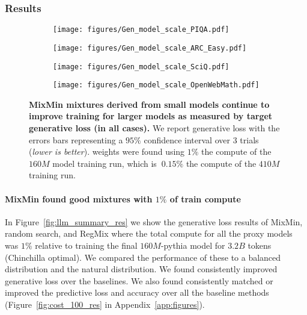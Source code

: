 \subsubsection{Results}


\begin{figure*}[t!]
\centering
\begin{subfigure}
    \centering
    \texttt{[image: figures/Gen\_model\_scale\_PIQA.pdf]}
\end{subfigure}%
\begin{subfigure}
    \centering
    \texttt{[image: figures/Gen\_model\_scale\_ARC\_Easy.pdf]}
\end{subfigure}
\begin{subfigure}
    \centering
    \texttt{[image: figures/Gen\_model\_scale\_SciQ.pdf]}
\end{subfigure}
\begin{subfigure}
    \centering
    \texttt{[image: figures/Gen\_model\_scale\_OpenWebMath.pdf]}
\end{subfigure}
\caption{\textbf{MixMin mixtures derived from small models continue to improve training for larger models as measured by target generative loss (in all cases).} We report generative loss with the errors bars representing a $95\%$ confidence interval over $3$ trials (\emph{lower is better}). \method weights were found using $1\%$ the compute of the $160M$ model training run, which is $~0.15\%$ the compute of the $410M$ training run.}
\label{fig:Gen_llm_model_scale_res}
\end{figure*}




\paragraph{MixMin found good mixtures with $1\%$ of train compute} In Figure~\ref{fig:llm_summary_res} we show the generative loss results of MixMin, random search, and RegMix where the total compute for all the proxy models was $1\%$ relative to training the final $160M$-pythia model for $3.2B$ tokens (Chinchilla optimal). We compared the performance of these to a balanced distribution and the natural distribution. We found \method consistently improved generative loss over the baselines. We also found \method consistently matched or improved the predictive loss and accuracy over all the baseline methods (Figure~\ref{fig:cost_100_res} in Appendix~\ref{app:figures}). %


